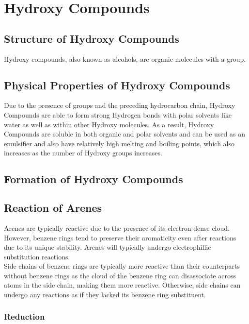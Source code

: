 \documentclass[../main]{subfiles}
\begin{document}
\section{Hydroxy Compounds}

	\subsection{Structure of Hydroxy Compounds}

	Hydroxy compounds, also known as alcohols, are organic molecules with a  group.

	\subsection{Physical Properties of Hydroxy Compounds}

	Due to the presence of  groups and the preceding hydrocarbon chain, Hydroxy Compounds are able to form strong Hydrogen bonds with polar solvents like water as well as within other Hydroxy molecules. As a result, Hydroxy Compounds are soluble in both organic and polar solvents and can be used as an emulsifier and also have relatively high melting and boiling points, which also increases as the number of Hydroxy groups increases.

	\subsection{Formation of Hydroxy Compounds}

	\subsection{Reaction of Arenes}

	Arenes are typically reactive due to the presence of its electron-dense  cloud. However, benzene rings tend to preserve their aromaticity even after reactions due to its unique stability. Arenes will typically undergo electrophillic substitution reactions. \\

	Side chains of benzene rings are typically more reactive than their counterparts without benzene rings as the  cloud of the benzene ring can disassociate across  atoms in the side chain, making them more reactive. Otherwise, side chains can undergo any reactions as if they lacked its benzene ring substituent.

	\subsubsection{Reduction}
\end{document}
